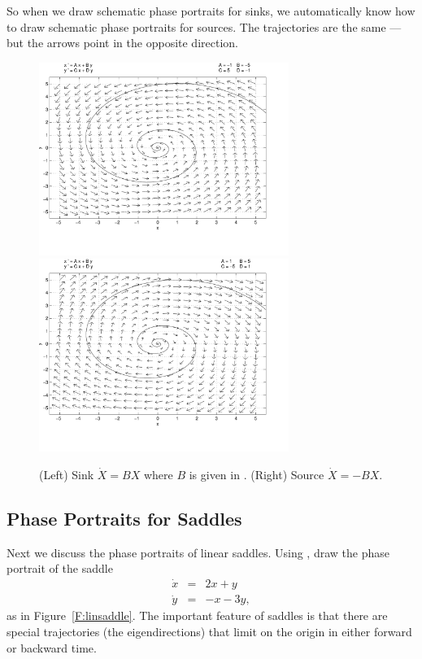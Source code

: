 \documentclass{ximera}
\begin{document}
So when we draw schematic phase portraits
for sinks, we automatically know
how to draw schematic phase portraits for
sources.  The trajectories are
the same --- but the arrows point in the opposite direction.

\begin{figure}[htb]
           \centerline{%
	   \includegraphics[width=3.2in]{../figures/asink.pdf}
           \includegraphics[width=3.2in]{../figures/asource.pdf}}
           \caption{(Left) Sink $\dot{X}=BX$ where $B$ is given in
\protect{\eqref{E:SS}}.  (Right) Source $\dot{X}=-BX$.}
           \label{F:SS}
\end{figure}


\subsection*{Phase Portraits for Saddles}

Next we discuss the phase portraits of linear saddles.  Using
{\pplane}, draw the phase portrait
of the saddle
\begin{equation}  \label{e:saddlet}
\begin{array}{rcl}
\dot{x} & = & 2x+y\\
\dot{y} & = & -x-3y,
\end{array}
\end{equation}
as in Figure~\ref{F:linsaddle}.  The important feature of saddles
is that there are special trajectories (the eigendirections) that
limit on the origin in either forward or backward time.
\end{document}
